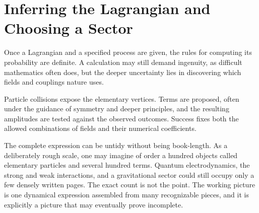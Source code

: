\section{Inferring the Lagrangian and Choosing a Sector}

Once a Lagrangian and a specified process are given, the rules for computing its probability are definite. A calculation may still demand ingenuity, as difficult mathematics often does, but the deeper uncertainty lies in discovering which fields and couplings nature uses.

\begin{classroomqa}
\end{classroomqa}

Particle collisions expose the elementary vertices. Terms are proposed, often under the guidance of symmetry and deeper principles, and the resulting amplitudes are tested against the observed outcomes. Success fixes both the allowed combinations of fields and their numerical coefficients.

\begin{classroomqa}
\end{classroomqa}

The complete expression can be untidy without being book-length. As a deliberately rough scale, one may imagine of order a hundred objects called elementary particles and several hundred terms. Quantum electrodynamics, the strong and weak interactions, and a gravitational sector could still occupy only a few densely written pages. The exact count is not the point. The working picture is one dynamical expression assembled from many recognizable pieces, and it is explicitly a picture that may eventually prove incomplete.

